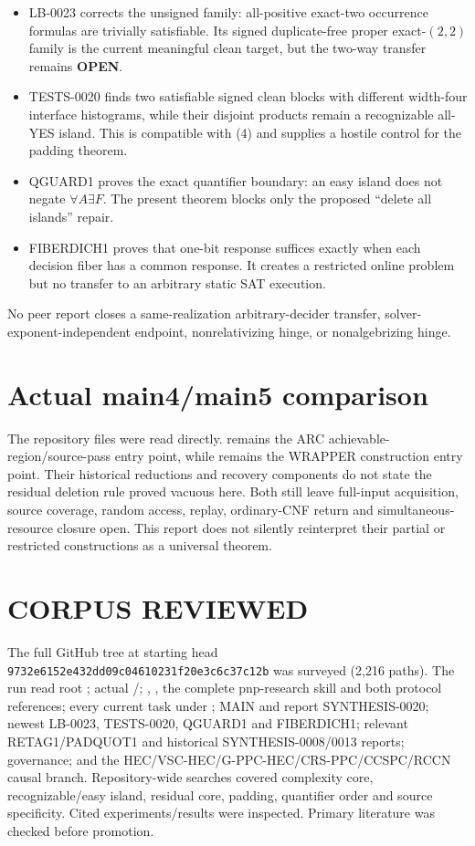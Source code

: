 \documentclass[11pt]{article}
\newcommand{\OPEN}{\textbf{OPEN}}
\begin{document}
\begin{itemize}
\item LB-0023 corrects the unsigned family: all-positive exact-two occurrence
formulas are trivially satisfiable.  Its signed duplicate-free proper
exact-$(2,2)$ family is the current meaningful clean target, but the two-way
transfer remains \OPEN.
\item TESTS-0020 finds two satisfiable signed clean blocks with different
width-four interface histograms, while their disjoint products remain a
recognizable all-YES island.  This is compatible with (4) and supplies a
hostile control for the padding theorem.
\item QGUARD1 proves the exact quantifier boundary: an easy island does not
negate $\forall A\exists F$.  The present theorem blocks only the proposed
``delete all islands'' repair.
\item FIBERDICH1 proves that one-bit response suffices exactly when each
decision fiber has a common response.  It creates a restricted online problem
but no transfer to an arbitrary static SAT execution.
\end{itemize}

No peer report closes a same-realization arbitrary-decider transfer,
solver-exponent-independent endpoint, nonrelativizing hinge, or
nonalgebrizing hinge.

\section{Actual main4/main5 comparison}

The repository files were read directly.   remains the ARC
achievable-region/source-pass entry point, while  remains the
WRAPPER construction entry point.  Their historical reductions and recovery
components do not state the residual deletion rule proved vacuous here.  Both
still leave full-input acquisition, source coverage, random access, replay,
ordinary-CNF return and simultaneous-resource closure open.  This report does
not silently reinterpret their partial or restricted constructions as a
universal theorem.

\section{CORPUS REVIEWED}

The full GitHub tree at starting head
\texttt{9732e6152e432dd09c04610231f20e3c6c37c12b} was surveyed (2,216 paths).
The run read root ; actual /;
, , the complete pnp-research skill and both
protocol references; every current task under ; MAIN and report
SYNTHESIS-0020; newest LB-0023, TESTS-0020, QGUARD1 and FIBERDICH1; relevant
RETAG1/PADQUOT1 and historical SYNTHESIS-0008/0013 reports; governance; and
the HEC/VSC-HEC/G-PPC-HEC/CRS-PPC/CCSPC/RCCN causal branch.  Repository-wide
searches covered complexity core, recognizable/easy island, residual core,
padding, quantifier order and source specificity.  Cited experiments/results
were inspected.  Primary literature was checked before promotion.
\end{document}

